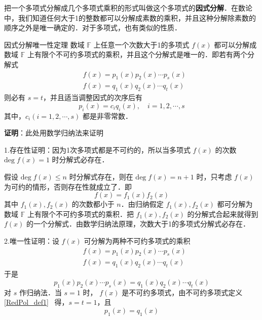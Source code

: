 
把一个多项式分解成几个多项式乘积的形式叫做这个多项式的\textbf{因式分解}．在数论中，我们知道任何大于1的整数都可以分解成素数的乘积，并且这种分解除素数的顺序之外是唯一确定的．对于多项式，也有类似的性质．
\begin{theorem}{因式分解唯一性定理}
数域 $\mathbb{F}$ 上任意一个次数大于1的多项式 $f(x)$ 都可以分解成数域 $\mathbb{F}$ 上有限个不可约多项式的乘积，并且这个分解式是唯一的．即若有两个分解式
 \begin{equation}
 \begin{aligned}
 &f(x)=p_1(x)p_2(x)\cdots p_s(x)\\
 &f(x)=q_1(x)q_2(x)\cdots q_t(x)
 \end{aligned}
 \end{equation}
 则必有 $s=t$，并且适当调整因式的次序后有
 \begin{equation}
 p_i(x)=c_iq_i(x),\quad i=1,2,\cdots,s
 \end{equation}
 其中，$c_i(i=1,2,\cdots,s)$ 都是非零常数．
\end{theorem}
\textbf{证明}：此处用数学归纳法来证明

1.存在性证明：因为1次多项式都是不可约的，所以当多项式 $f(x)$ 的次数 $\mathrm{deg}\;f(x)=1$ 时分解式必存在．

假设 $\mathrm{deg}\;f(x)\leq n$ 时分解式存在，则在 $\mathrm{deg}\;f(x)=n+1$ 时，只考虑 $f(x)$ 为可约的情形，否则存在性就成立了．即
\begin{equation}
f(x)=f_1(x)f_2(x)
\end{equation}
其中 $f_1(x),f_2(x)$ 的次数都小于 $n$．由归纳假定 $f_1(x),f_2(x)$ 都可分解为数域 $\mathbb{F}$ 上有限个不可约多项式的乘积．把 $f_1(x),f_2(x)$ 的分解式合起来就得到 $f(x)$ 的一个分解式．由数学归纳法原理，次数大于1的多项式分解式必存在．

 2.唯一性证明：设 $f(x)$ 可分解为两种不可约多项式的乘积
 \begin{equation}
 \begin{aligned}
 &f(x)=p_1(x)p_2(x)\cdots p_s(x)\\
 &f(x)=q_1(x)q_2(x)\cdots q_t(x)
 \end{aligned}
 \end{equation}
 于是
 \begin{equation}\label{UniFac_eq1}
 p_1(x)p_2(x)\cdots p_s(x)=q_1(x)q_2(x)\cdots q_t(x)
 \end{equation}
 对 $s$ 作归纳法．当 $s=1$ 时， $f(x)$ 是不可约多项式，由不可约多项式定义\autoref{RedPol_def1}~ 得，$s=t=1$，且
 \begin{equation}
 p_1(x)=q_1(x)
 \end{equation}
 
